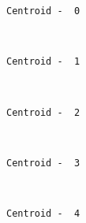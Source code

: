 \documentclass[11pt]{article}
\begin{document}
    \begin{Verbatim}[commandchars=\\\{\}]
Centroid -  0

    \end{Verbatim}

    \begin{center}
    \end{center}
    { \hspace*{\fill} \\}
    
    \begin{Verbatim}[commandchars=\\\{\}]
Centroid -  1

    \end{Verbatim}

    \begin{center}
    \end{center}
    { \hspace*{\fill} \\}
    
    \begin{Verbatim}[commandchars=\\\{\}]
Centroid -  2

    \end{Verbatim}

    \begin{center}
    \end{center}
    { \hspace*{\fill} \\}
    
    \begin{Verbatim}[commandchars=\\\{\}]
Centroid -  3

    \end{Verbatim}

    \begin{center}
    \end{center}
    { \hspace*{\fill} \\}
    
    \begin{Verbatim}[commandchars=\\\{\}]
Centroid -  4

    \end{Verbatim}
\end{document}

